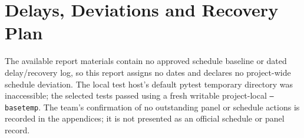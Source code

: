 \section{Delays, Deviations and Recovery Plan}
The available report materials contain no approved schedule baseline or dated delay/recovery log, so this report assigns no dates and declares no project-wide schedule deviation. The local test host's default pytest temporary directory was inaccessible; the selected tests passed using a fresh writable project-local \texttt{--basetemp}. The team's confirmation of no outstanding panel or schedule actions is recorded in the appendices; it is not presented as an official schedule or panel record.
